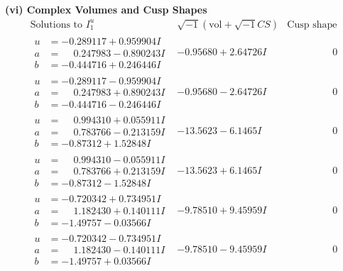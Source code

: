 \documentclass[1p]{elsarticle_modified}
\theoremstyle{definition}
\newcommand{\I}{\sqrt{-1}}
\begin{document}
\newpage\flushleft \textbf{(vi) Complex Volumes and Cusp Shapes}
$$\begin{array}{c|c|c}  
\text{Solutions to }I^u_{1}& \I (\text{vol} + \sqrt{-1}CS) & \text{Cusp shape}\\
 \hline 
\begin{aligned}
u &= -0.289117 + 0.959904 I \\
a &= \phantom{-}0.247983 - 0.890243 I \\
b &= -0.444716 + 0.246446 I\end{aligned}
 & -0.95680 + 2.64726 I & \phantom{-0.000000 } 0 \\ \hline\begin{aligned}
u &= -0.289117 - 0.959904 I \\
a &= \phantom{-}0.247983 + 0.890243 I \\
b &= -0.444716 - 0.246446 I\end{aligned}
 & -0.95680 - 2.64726 I & \phantom{-0.000000 } 0 \\ \hline\begin{aligned}
u &= \phantom{-}0.994310 + 0.055911 I \\
a &= \phantom{-}0.783766 - 0.213159 I \\
b &= -0.87312 + 1.52848 I\end{aligned}
 & -13.5623 - 6.1465 I & \phantom{-0.000000 } 0 \\ \hline\begin{aligned}
u &= \phantom{-}0.994310 - 0.055911 I \\
a &= \phantom{-}0.783766 + 0.213159 I \\
b &= -0.87312 - 1.52848 I\end{aligned}
 & -13.5623 + 6.1465 I & \phantom{-0.000000 } 0 \\ \hline\begin{aligned}
u &= -0.720342 + 0.734951 I \\
a &= \phantom{-}1.182430 + 0.140111 I \\
b &= -1.49757 - 0.03566 I\end{aligned}
 & -9.78510 + 9.45959 I & \phantom{-0.000000 } 0 \\ \hline\begin{aligned}
u &= -0.720342 - 0.734951 I \\
a &= \phantom{-}1.182430 - 0.140111 I \\
b &= -1.49757 + 0.03566 I\end{aligned}
 & -9.78510 - 9.45959 I & \phantom{-0.000000 } 0 \\ \hline\begin{aligned}

\end{aligned}
\end{array}$$
\end{document}
